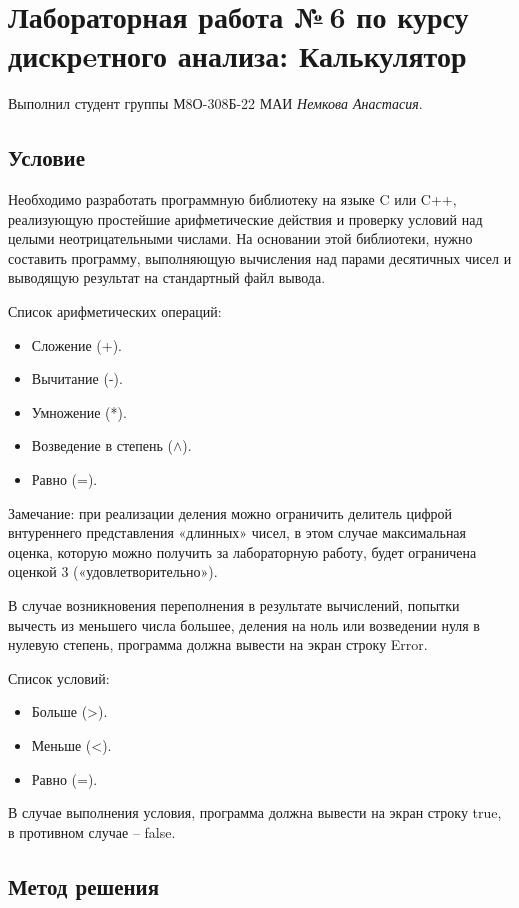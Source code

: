 \documentclass[12pt]{article}
\begin{document}
\section*{Лабораторная работа №\,6 по курсу дискрeтного анализа: Калькулятор}

Выполнил студент группы М8О-308Б-22 МАИ \textit{Немкова Анастасия}.

\subsection*{Условие}
Необходимо разработать программную библиотеку на языке C или C++, реализующую простейшие арифметические действия и проверку условий над целыми неотрицательными числами. На основании этой библиотеки, нужно составить программу, выполняющую вычисления над парами десятичных чисел и выводящую результат на стандартный файл вывода.

Список арифметических операций:
\begin{itemize}
    \item Сложение (+).
    \item Вычитание (-).
    \item Умножение (*).
    \item Возведение в степень ($\wedge$).
    \item Равно (=).
\end{itemize}

Замечание: при реализации деления можно ограничить делитель цифрой внтуреннего представления «длинных» чисел, в этом случае максимальная оценка, которую можно получить за лабораторную работу, будет ограничена оценкой 3 («удовлетворительно»).

В случае возникновения переполнения в результате вычислений, попытки вычесть из меньшего числа большее, деления на ноль или возведении нуля в нулевую степень, программа должна вывести на экран строку Error.

Список условий:
\begin{itemize}
    \item Больше (>).
    \item Меньше (<).
    \item Равно (=).
\end{itemize}

В случае выполнения условия, программа должна вывести на экран строку true, в противном случае – false.

\subsection*{Метод решения}
\end{document}
